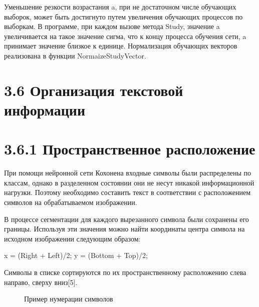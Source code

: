 \documentclass[14pt,a4paper]{extreport}
\begin{document}
   \hspace {4ex} Уменьшение резкости возрастания a, при не достаточном числе обучающих выборок, может быть достигнуто путем увеличения обучающих процессов по выборкам. В программе, при каждом вызове метода Study, значение a увеличивается на такое значение сигма, что к концу процесса обучения сети, a принимает значение близкое к единице.
Нормализация обучающих векторов реализована в функции  NormaizeStudyVector.\

                  \section*{\normalsize\hspace{4ex}3.6 Организация текстовой информации} 
                  
            \section*{\normalsize\hspace{4ex}3.6.1 Пространственное расположение} 
                     
 \hspace {4ex} При помощи нейронной сети Кохонена входные символы были распределены по классам, однако в разделенном состоянии они не несут никакой информационной нагрузки. Поэтому необходимо составить текст в соответствии с расположением символов на обрабатываемом изображении. \     
 
 \hspace {4ex} В процессе сегментации для каждого вырезанного символа были сохранены его границы. Используя эти значения можно найти координаты центра символа на исходном изображении следующим образом:

\hspace {4ex} x = (Right + Left)/2;
\hspace {4ex} y = (Bottom + Top)/2;

\hspace {4ex} Символы в списке сортируются по их пространственному расположению слева направо, сверху вниз[5].

\begin{figure}[h!]
\caption{Пример нумерации символов}
\end{figure}
\end{document}
